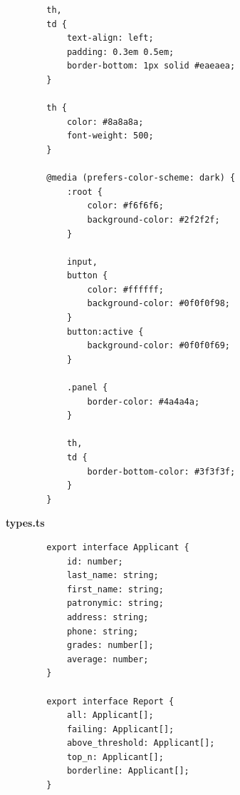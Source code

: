 \documentclass[14pt, a4paper]{extreport}
\begin{document}
\begin{verbatim}
		th,
		td {
			text-align: left;
			padding: 0.3em 0.5em;
			border-bottom: 1px solid #eaeaea;
		}
		
		th {
			color: #8a8a8a;
			font-weight: 500;
		}
		
		@media (prefers-color-scheme: dark) {
			:root {
				color: #f6f6f6;
				background-color: #2f2f2f;
			}
			
			input,
			button {
				color: #ffffff;
				background-color: #0f0f0f98;
			}
			button:active {
				background-color: #0f0f0f69;
			}
			
			.panel {
				border-color: #4a4a4a;
			}
			
			th,
			td {
				border-bottom-color: #3f3f3f;
			}
		}
	\end{verbatim}
	
	\textbf{types.ts}
	
	\begin{verbatim}
		export interface Applicant {
			id: number;
			last_name: string;
			first_name: string;
			patronymic: string;
			address: string;
			phone: string;
			grades: number[];
			average: number;
		}
		
		export interface Report {
			all: Applicant[];
			failing: Applicant[];
			above_threshold: Applicant[];
			top_n: Applicant[];
			borderline: Applicant[];
		}
	\end{verbatim}
\end{document}
